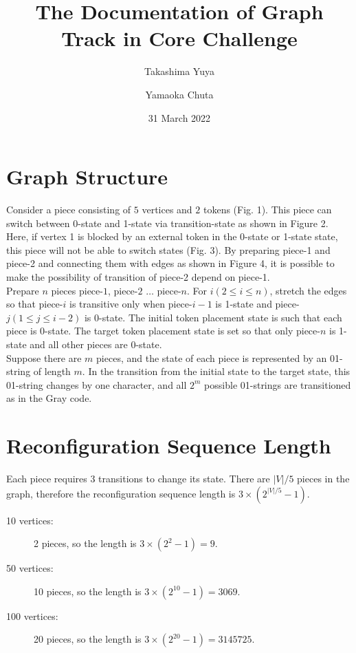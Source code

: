 \documentclass[dvipdfmx,autodetect-engine]{jsarticle}
\title{The Documentation of Graph Track in Core Challenge}
\author[1]{Takashima Yuya}
\author[1]{Yamaoka Chuta}
\affil[1]{Minato laboratory of Kyoto University}
\date{31 March 2022}
\begin{document}
\maketitle
\section{Graph Structure}
Consider a piece consisting of $5$ vertices and $2$ tokens (Fig. 1).
This piece can switch between 0-state and 1-state via transition-state as shown in Figure 2.\\
Here, if vertex 1 is blocked by an external token in the 0-state or 1-state state, this piece will not be able to switch states (Fig. 3). 
By preparing piece-1 and piece-2 and connecting them with edges as shown in Figure 4, it is possible to make the possibility of transition of piece-2 depend on piece-1.\\
Prepare $n$ pieces piece-$1$, piece-$2$ $\ldots$ piece-$n$. For $i (2 \le i \le n)$, stretch the edges so that piece-$i$ is transitive only when piece-$i-1$ is 1-state and piece-$j (1 \le j \le i-2)$ is 0-state.
The initial token placement state is such that each piece is 0-state.
The target token placement state is set so that only piece-$n$ is 1-state and all other pieces are 0-state.\\
Suppose there are $m$ pieces, and the state of each piece is represented by an 01-string of length $m$. In the transition from the initial state to the target state, this 01-string changes by one character, and all $2^m$ possible 01-strings are transitioned as in the Gray code.


\section{Reconfiguration Sequence Length}
Each piece requires $3$ transitions to change its state.
There are $|V|/5$ pieces in the graph, therefore the reconfiguration sequence length is $3 \times (2^{|V|/5} - 1)$.

\begin{description}
    \item[10 vertices:] 2 pieces, so the length is $3 \times (2^2 - 1) = 9$.
    \item[50 vertices:] 10 pieces, so the length is $3 \times (2^{10} - 1) = 3069$.
    \item[100 vertices:] 20 pieces, so the length is $3 \times (2^{20} - 1) = 3145725$.
\end{description}
\end{document}
